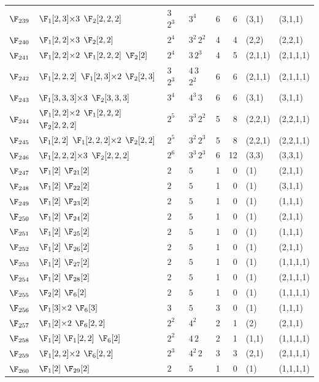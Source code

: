 \begin{landscape}
{\begin{longtable}{@{}l p{8.2cm} l l r r l l@{}}
$\F_{239}$ & $\F_{1}[2,3]{\times}3$\; $\F_{2}[2,2,2]$ & $3$\,$2^{3}$ & $3^{4}$ & 6 & 6 & (3,1) & (3,1,1) \\
$\F_{240}$ & $\F_{1}[2,2]{\times}3$\; $\F_{2}[2,2]$ & $2^{4}$ & $3^{2}$\,$2^{2}$ & 4 & 4 & (2,2) & (2,2,1) \\
$\F_{241}$ & $\F_{1}[2,2]{\times}2$\; $\F_{1}[2,2,2]$\; $\F_{2}[2]$ & $2^{4}$ & $3$\,$2^{3}$ & 4 & 5 & (2,1,1) & (2,1,1,1) \\
$\F_{242}$ & $\F_{1}[2,2,2]$\; $\F_{1}[2,3]{\times}2$\; $\F_{2}[2,3]$ & $3$\,$2^{3}$ & $4$\,$3$\,$2^{2}$ & 6 & 6 & (2,1,1) & (2,1,1,1) \\
$\F_{243}$ & $\F_{1}[3,3,3]{\times}3$\; $\F_{2}[3,3,3]$ & $3^{4}$ & $4^{3}$\,$3$ & 6 & 6 & (3,1) & (3,1,1) \\
$\F_{244}$ & $\F_{1}[2,2]{\times}2$\; $\F_{1}[2,2,2]$\; $\F_{2}[2,2,2]$ & $2^{5}$ & $3^{3}$\,$2^{2}$ & 5 & 8 & (2,2,1) & (2,2,1,1) \\
$\F_{245}$ & $\F_{1}[2,2]$\; $\F_{1}[2,2,2]{\times}2$\; $\F_{2}[2,2]$ & $2^{5}$ & $3^{2}$\,$2^{3}$ & 5 & 8 & (2,2,1) & (2,2,1,1) \\
$\F_{246}$ & $\F_{1}[2,2,2]{\times}3$\; $\F_{2}[2,2,2]$ & $2^{6}$ & $3^{3}$\,$2^{3}$ & 6 & 12 & (3,3) & (3,3,1) \\
$\F_{247}$ & $\F_{1}[2]$\; $\F_{21}[2]$ & $2$ & $5$ & 1 & 0 & (1) & (2,1,1) \\
$\F_{248}$ & $\F_{1}[2]$\; $\F_{22}[2]$ & $2$ & $5$ & 1 & 0 & (1) & (3,1,1) \\
$\F_{249}$ & $\F_{1}[2]$\; $\F_{23}[2]$ & $2$ & $5$ & 1 & 0 & (1) & (1,1,1) \\
$\F_{250}$ & $\F_{1}[2]$\; $\F_{24}[2]$ & $2$ & $5$ & 1 & 0 & (1) & (2,1,1) \\
$\F_{251}$ & $\F_{1}[2]$\; $\F_{25}[2]$ & $2$ & $5$ & 1 & 0 & (1) & (1,1,1) \\
$\F_{252}$ & $\F_{1}[2]$\; $\F_{26}[2]$ & $2$ & $5$ & 1 & 0 & (1) & (2,1,1) \\
$\F_{253}$ & $\F_{1}[2]$\; $\F_{27}[2]$ & $2$ & $5$ & 1 & 0 & (1) & (1,1,1,1) \\
$\F_{254}$ & $\F_{1}[2]$\; $\F_{28}[2]$ & $2$ & $5$ & 1 & 0 & (1) & (2,1,1,1) \\
$\F_{255}$ & $\F_{2}[2]$\; $\F_{6}[2]$ & $2$ & $5$ & 1 & 0 & (1) & (1,1,1,1) \\
$\F_{256}$ & $\F_{1}[3]{\times}2$\; $\F_{6}[3]$ & $3$ & $5$ & 3 & 0 & (1) & (1,1,1) \\
$\F_{257}$ & $\F_{1}[2]{\times}2$\; $\F_{6}[2,2]$ & $2^{2}$ & $4^{2}$ & 2 & 1 & (2) & (2,1,1) \\
$\F_{258}$ & $\F_{1}[2]$\; $\F_{1}[2,2]$\; $\F_{6}[2]$ & $2^{2}$ & $4$\,$2$ & 2 & 1 & (1,1) & (1,1,1,1) \\
$\F_{259}$ & $\F_{1}[2,2]{\times}2$\; $\F_{6}[2,2]$ & $2^{3}$ & $4^{2}$\,$2$ & 3 & 3 & (2,1) & (2,1,1,1) \\
$\F_{260}$ & $\F_{1}[2]$\; $\F_{29}[2]$ & $2$ & $5$ & 1 & 0 & (1) & (1,1,1,1) \\
\end{longtable}}
\end{landscape}


